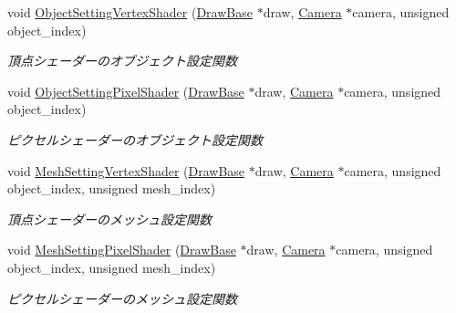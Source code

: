 \begin{DoxyCompactItemize}
void \mbox{\hyperlink{class_shader_manager_a8c7505114a88fdffa534737bb29ba6fa}{Object\+Setting\+Vertex\+Shader}} (\mbox{\hyperlink{class_draw_base}{Draw\+Base}} $\ast$draw, \mbox{\hyperlink{class_camera}{Camera}} $\ast$camera, unsigned object\+\_\+index)
\begin{DoxyCompactList}\small\item\em 頂点シェーダーのオブジェクト設定関数 \end{DoxyCompactList}\item 
void \mbox{\hyperlink{class_shader_manager_a4d970eb653aa67a9e7fc0b37ab05d73d}{Object\+Setting\+Pixel\+Shader}} (\mbox{\hyperlink{class_draw_base}{Draw\+Base}} $\ast$draw, \mbox{\hyperlink{class_camera}{Camera}} $\ast$camera, unsigned object\+\_\+index)
\begin{DoxyCompactList}\small\item\em ピクセルシェーダーのオブジェクト設定関数 \end{DoxyCompactList}\item 
void \mbox{\hyperlink{class_shader_manager_aa54f11169f0b7357b136910a3177a177}{Mesh\+Setting\+Vertex\+Shader}} (\mbox{\hyperlink{class_draw_base}{Draw\+Base}} $\ast$draw, \mbox{\hyperlink{class_camera}{Camera}} $\ast$camera, unsigned object\+\_\+index, unsigned mesh\+\_\+index)
\begin{DoxyCompactList}\small\item\em 頂点シェーダーのメッシュ設定関数 \end{DoxyCompactList}\item 
void \mbox{\hyperlink{class_shader_manager_a1493f19d52f73e9fa274ddb4a628807e}{Mesh\+Setting\+Pixel\+Shader}} (\mbox{\hyperlink{class_draw_base}{Draw\+Base}} $\ast$draw, \mbox{\hyperlink{class_camera}{Camera}} $\ast$camera, unsigned object\+\_\+index, unsigned mesh\+\_\+index)
\begin{DoxyCompactList}\small\item\em ピクセルシェーダーのメッシュ設定関数 \end{DoxyCompactList}\end{DoxyCompactItemize}
